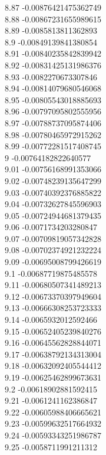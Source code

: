 {8.87	-0.00876421475362749\\
8.88	-0.00867231655989615\\
8.89	-0.0085813811362893\\
8.9	-0.00849139841380854\\
8.91	-0.00840235842839942\\
8.92	-0.00831425131986376\\
8.93	-0.0082270673307846\\
8.94	-0.00814079680546068\\
8.95	-0.00805543018885693\\
8.96	-0.00797095802555956\\
8.97	-0.00788737095874406\\
8.98	-0.00780465972915262\\
8.99	-0.00772281517408745\\
9	-0.00764182822640577\\
9.01	-0.00756168991353066\\
9.02	-0.00748239135647299\\
9.03	-0.00740392376885822\\
9.04	-0.00732627845596903\\
9.05	-0.00724944681379435\\
9.06	-0.0071734203280847\\
9.07	-0.00709819057342828\\
9.08	-0.00702374921232224\\
9.09	-0.00695008799426619\\
9.1	-0.00687719875485578\\
9.11	-0.00680507341489213\\
9.12	-0.00673370397949604\\
9.13	-0.00666308253723333\\
9.14	-0.0065932012592466\\
9.15	-0.00652405239840276\\
9.16	-0.00645562828844071\\
9.17	-0.00638792134313004\\
9.18	-0.00632092405544412\\
9.19	-0.00625462899673631\\
9.2	-0.00618902881592415\\
9.21	-0.0061241162386847\\
9.22	-0.00605988406665621\\
9.23	-0.00599632517664932\\
9.24	-0.00593343251986787\\
9.25	-0.0058711991211312\\
}
